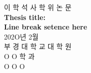 \thispagestyle{empty}

\begin{center}
{\fontsize{14pt}{14}\selectfont
이 학 석 사 학 위 논 문}\\[1.5cm]
{\fontsize{22pt}{22}\selectfont
\textbf{Thesis title:\\
    Line break setence here}\\[7cm]}
{\fontsize{12pt}{12}\selectfont
202O년 2월\\[1cm]}
{\fontsize{14pt}{14}\selectfont
부 경 대 학 교 대 학 원}\\[1cm]
{\fontsize{14pt}{14}\selectfont
O O 학 과}\\[1cm]
{\fontsize{14pt}{14}\selectfont
O O O}\\[1cm]
\end{center}

\newpage
